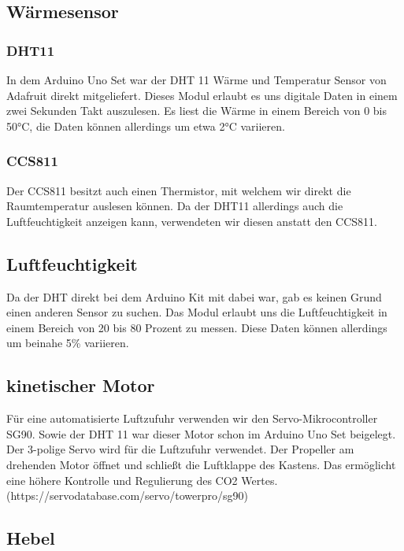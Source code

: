 \subsection{Wärmesensor}

\subsubsection{DHT11}

In dem Arduino Uno Set war der DHT 11 Wärme und Temperatur Sensor von Adafruit direkt mitgeliefert. Dieses Modul erlaubt es uns digitale Daten in einem zwei Sekunden Takt auszulesen. Es liest die Wärme in einem Bereich von 0 bis 50°C, die Daten können allerdings um etwa 2°C variieren.

\subsubsection{CCS811}

Der CCS811 besitzt auch einen Thermistor, mit welchem wir direkt die Raumtemperatur auslesen können. Da der DHT11 allerdings auch die Luftfeuchtigkeit anzeigen kann, verwendeten wir diesen anstatt den CCS811. 
\cite{CCS811man}

\subsection{Luftfeuchtigkeit}

Da der DHT direkt bei dem Arduino Kit mit dabei war, gab es keinen Grund einen anderen Sensor zu suchen. Das Modul erlaubt uns die Luftfeuchtigkeit in einem Bereich von 20 bis 80 Prozent zu messen. Diese Daten können allerdings um beinahe 5\% variieren.  

\subsection{kinetischer Motor}

Für eine automatisierte Luftzufuhr verwenden wir den Servo-Mikrocontroller SG90. Sowie der DHT 11 war dieser Motor schon im Arduino Uno Set beigelegt. Der 3-polige Servo wird für die Luftzufuhr verwendet. Der Propeller am drehenden Motor öffnet und schließt die Luftklappe des Kastens. Das ermöglicht eine höhere Kontrolle und Regulierung des CO2 Wertes. (https://servodatabase.com/servo/towerpro/sg90)

\subsection{Hebel}

